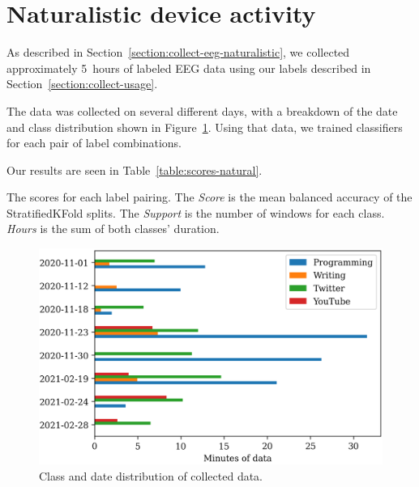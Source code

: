     \section{Naturalistic device activity}

        As described in Section~\ref{section:collect-eeg-naturalistic}, we collected approximately \SI{5}{hours} of labeled EEG data using our labels described in Section~\ref{section:collect-usage}. 

        The data was collected on several different days, with a breakdown of the date and class distribution shown in Figure~\ref{figure:dayclass-dist}. Using that data, we trained classifiers for each pair of label combinations. 

        Our results are seen in Table~\ref{table:scores-natural}.


        \begin{table}[h]
            \centering
            
            \caption{The scores for each label pairing. The \textit{Score} is the mean balanced accuracy of the StratifiedKFold splits. The \textit{Support} is the number of windows for each class. \textit{Hours} is the sum of both classes' duration.}\label{table:scores-natural}
        \end{table}

        \begin{figure}[h]
            \centering
            \includegraphics[width=12cm]{img/naturalistic-dayclass-dist.png}
            \caption{Class and date distribution of collected data.}\label{figure:dayclass-dist}
        \end{figure}

        \vfill
